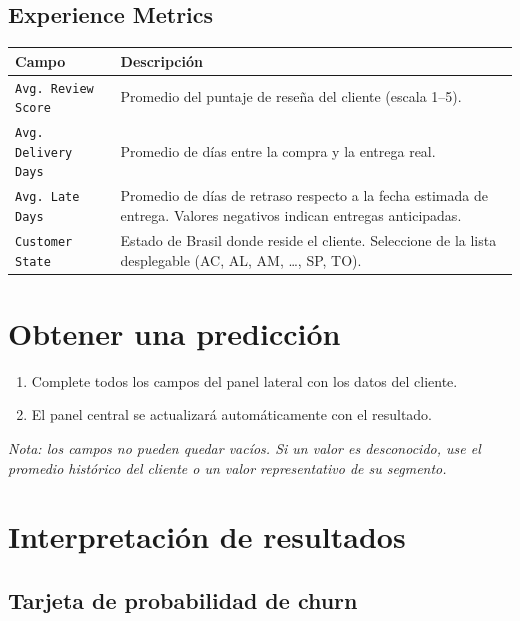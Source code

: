 \documentclass[11pt]{article}
\begin{document}
\subsection{Experience Metrics}

\begin{center}
\begin{tabular}{lp{9cm}}
\toprule
\textbf{Campo} & \textbf{Descripción} \\
\midrule
\texttt{Avg. Review Score} &
  Promedio del puntaje de reseña del cliente (escala 1--5). \\[4pt]
\texttt{Avg. Delivery Days} &
  Promedio de días entre la compra y la entrega real. \\[4pt]
\texttt{Avg. Late Days} &
  Promedio de días de retraso respecto a la fecha estimada de entrega.
  Valores negativos indican entregas anticipadas. \\[4pt]
\texttt{Customer State} &
  Estado de Brasil donde reside el cliente. Seleccione de la lista desplegable
  (AC, AL, AM, \ldots, SP, TO). \\
\bottomrule
\end{tabular}
\end{center}

\section{Obtener una predicción}

\begin{enumerate}[itemsep=4pt]
  \item Complete todos los campos del panel lateral con los datos del cliente.
  
  \item El panel central se actualizará automáticamente con el resultado.
\end{enumerate}

\noindent\textit{Nota: los campos no pueden quedar vacíos. Si un valor es
desconocido, use el promedio histórico del cliente o un valor representativo
de su segmento.}

\section{Interpretación de resultados}

\subsection{Tarjeta de probabilidad de churn}
\end{document}
